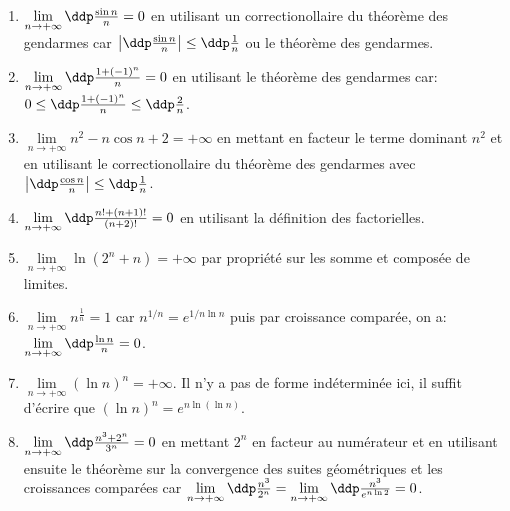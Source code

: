 \begin{correction}
\begin{enumerate}
\item
$\lim \limits_{n\to +\infty}\ddp\frac{\sin{n}}{n}=0$ en utilisant un correctionollaire du th\'eor\`eme des gendarmes car $\left| \ddp\frac{\sin{n}}{n} \right|\leq \ddp\frac{1}{n}$ ou le th\'eor\`{e}me des gendarmes.
\item 
$\lim \limits_{n\to +\infty}\ddp\frac{1+(-1)^n}{n}=0$ en utilisant le th\'eor\`eme des gendarmes car: $0\leq \ddp\frac{1+(-1)^n}{n}\leq \ddp\frac{2}{n}$.
\item
$\lim \limits_{n\to +\infty}n^2-n\cos{n}+2=+\infty$ en mettant en facteur le terme dominant $n^2$ et en utilisant le correctionollaire du th\'eor\`eme des gendarmes avec $\left| \ddp\frac{\cos{n}}{n} \right|\leq\ddp\frac{1}{n}$.
\item
$\lim \limits_{n\to +\infty}\ddp\frac{n!+(n+1)!}{(n+2)!}=0$ en utilisant la d\'efinition des factorielles.
\item
$\lim \limits_{n\to +\infty}\ln{(2^n+n)}=+\infty$ par propri\'et\'e sur les somme et compos\'ee de limites.
\item
$\lim \limits_{n\to +\infty}n^{\frac{1}{n}}=1$ car $n^{1/n}=e^{1/n\ln{n}}$ puis par croissance compar\'ee, on a: $\lim\limits_{n\to +\infty} \ddp\frac{\ln{n}}{n}=0$.  
\item
$\lim \limits_{n\to +\infty}(\ln{n})^n=+\infty$. Il n'y a pas de forme ind\'etermin\'ee ici, il suffit d'\'ecrire que $\left( \ln{n}\right)^n=e^{n\ln{(\ln{n})}}$.
\item
$\lim \limits_{n\to +\infty}\ddp\frac{n^3+2^n}{3^n}=0$ en mettant $2^n$ en facteur au num\'erateur et en utilisant ensuite le th\'eor\`eme sur la convergence des suites g\'eom\'etriques et les croissances compar\'ees car $\lim\limits_{n\to +\infty} \ddp\frac{n^3}{2^n}=\lim\limits_{n\to +\infty} \ddp\frac{n^3}{e^{n\ln{2}}}=0$. 

\end{enumerate}
\end{correction}
